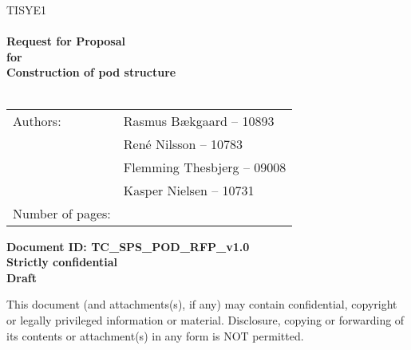 \documentclass[Main]{subfiles}
\begin{document}
\begin{center}

\textsc{\Large TISYE1}\\[0.5cm]


\HRule \\[0.4cm]

{ \huge \bfseries Request for Proposal}\\[0.4cm]
{ \huge \bfseries for}\\[0.4cm] 
{ \huge \bfseries Construction of pod structure}\\[0.4cm]

\HRule \\[1.5cm]

\begin{tabular}{p{}|p{}}
\hline 
Authors: & Rasmus Bækgaard -- 10893\\ &René Nilsson -- 10783\\ &Flemming Thesbjerg -- 09008\\ &Kasper Nielsen -- 10731\\ 
\hline 
Number of pages: & \pageref{LastPage} \\
\hline 
\end{tabular} 

\textbf{\Large Document ID: TC\_SPS\_POD\_RFP\_v1.0}\\
\textbf{\Large Strictly confidential}\\
\textbf{\Large Draft}

This document (and attachments(s), if any) may contain confidential, copyright or legally privileged information or material.
Disclosure, copying or forwarding of its contents or attachment(s) in any form is NOT permitted.
\end{center}
\end{document}
